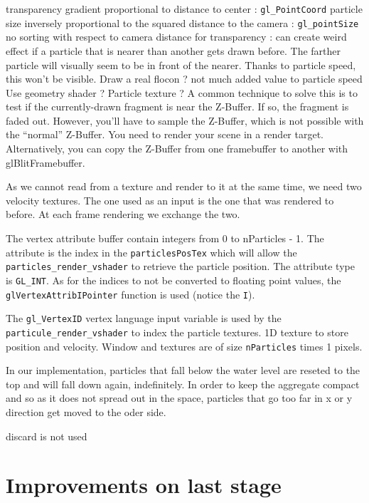 \documentclass[a4paper,11pt]{article}
\begin{document}
transparency gradient proportional to distance to center : \texttt{gl\_PointCoord}
particle size inversely proportional to the squared distance to the camera : \texttt{gl\_pointSize}
no sorting with respect to camera distance for transparency : can create weird effect if a particle that is nearer than another gets drawn before. The farther particle will visually seem to be in front of the nearer. Thanks to particle speed, this won't be visible.
Draw a real flocon ? not much added value to particle speed
Use geometry shader ?
Particle texture ?
A common technique to solve this is to test if the currently-drawn fragment is near the Z-Buffer. If so, the fragment is faded out. However, you’ll have to sample the Z-Buffer, which is not possible with the “normal” Z-Buffer. You need to render your scene in a render target. Alternatively, you can copy the Z-Buffer from one framebuffer to another with glBlitFramebuffer.

As we cannot read from a texture and render to it at the same time, we need two velocity textures. The one used as an input is the one that was rendered to before. At each frame rendering we exchange the two.

The vertex attribute buffer contain integers from 0 to nParticles - 1. The attribute is the index in the \texttt{particlesPosTex} which will allow the \texttt{particles\_render\_vshader} to retrieve the particle position. The attribute type is \texttt{GL\_INT}. As for the indices to not be converted to floating point values, the \texttt{glVertexAttribIPointer} function is used (notice the \texttt{I}).

The \texttt{gl\_VertexID} vertex language input variable is used by the \texttt{particule\_render\_vshader} to index the particle textures.
1D texture to store position and velocity.
Window and textures are of size \texttt{nParticles} times 1 pixels.

In our implementation, particles that fall below the water level are reseted to the top and will fall down again, indefinitely. In order to keep the aggregate compact and so as it does not spread out in the space, particles that go too far in x or y direction get moved to the oder side.

discard is not used

\section{Improvements on last stage}
\end{document}
